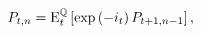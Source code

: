\begin{equation} \label{eq:nPzeroQ}
	P_{t,n} = \mathrm{E}^{\mathbb{Q}}_{t} \left[ \exp\left(- i_{t}\right) P_{t+1,n-1} \right],
\end{equation}